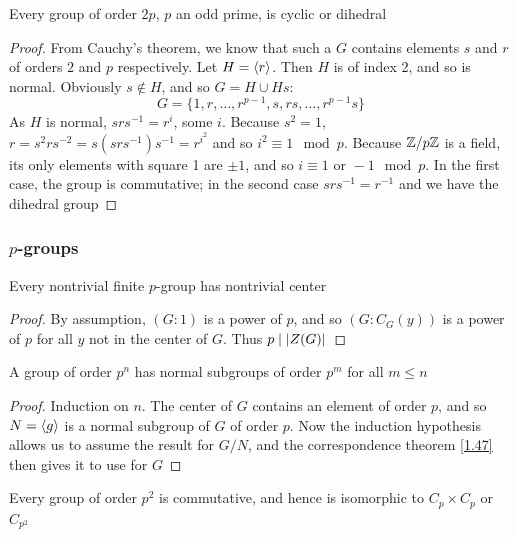 \documentclass[11pt]{article}
\begin{document}
\begin{corollary}[]
Every group of order \(2p\), \(p\) an odd prime, is cyclic or dihedral
\end{corollary}

\begin{proof}
From Cauchy's theorem, we know that such a \(G\) contains elements \(s\) and \(r\) of
orders \(2\) and \(p\) respectively. Let \(H=\langle r\rangle\). Then \(H\) is of index 2, and so is normal.
Obviously \(s\notin H\), and so \(G=H\cup Hs\):
\begin{equation*}
G=\{1,r,\dots,r^{p-1},s,rs,\dots,r^{p-1}s\}
\end{equation*}
As \(H\) is normal, \(srs^{-1}=r^i\), some \(i\).
Because \(s^2=1\), \(r=s^2rs^{-2}=s(srs^{-1})s^{-1}=r^{i^2}\) and so \(i^2\equiv 1\mod p\).
Because \(\mathbb{Z}/p\mathbb{Z}\) is a field, its only elements with square 1 are \(\pm 1\), and
so \(i\equiv 1\text{ or }-1\mod p\). In the first case, the group is commutative; in the second
case \(srs^{-1}=r^{-1}\) and we have the dihedral group
\end{proof}

\subsubsection{\texorpdfstring{\(p\)}{p}-groups}
\label{sec:orgc3e3bce}
\begin{theorem}[]
Every nontrivial finite \(p\)-group has nontrivial center
\end{theorem}

\begin{proof}
By assumption, \((G:1)\) is a power of \(p\), and so \((G:C_G(y))\) is a power of \(p\) for
all \(y\) not in the center of \(G\). Thus \(p\mid\abs{Z(G)}\)
\end{proof}

\begin{corollary}[]
A group of order \(p^n\) has normal subgroups of order \(p^m\) for all \(m\le n\)
\end{corollary}

\begin{proof}
Induction on \(n\). The center of \(G\) contains an element of order \(p\), and so \(N=\langle g\rangle\) is
a normal subgroup of \(G\) of order \(p\). Now the induction hypothesis allows us to assume the
result for \(G/N\), and the correspondence theorem \ref{1.47} then gives it to use for \(G\)
\end{proof}

\begin{proposition}[]
Every group of order \(p^2\) is commutative, and hence is isomorphic to \(C_p\times C_p\) or \(C_{p^2}\)
\end{proposition}
\end{document}
